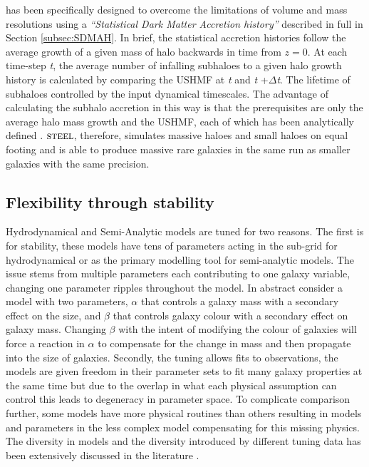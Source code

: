 \steel has been specifically designed to overcome the limitations of volume and mass resolutions using a \textit{``Statistical Dark Matter Accretion history''} described in full in Section \ref{subsec:SDMAH}. In brief, the statistical accretion histories follow the average growth of a given mass of halo backwards in time from $z = 0$. At each time-step \textit{t}, the average number of infalling subhaloes to a given halo growth history is calculated by comparing the USHMF at \textit{t} and \textit{t} +$\Delta$\textit{t}. The lifetime of subhaloes controlled by the input dynamical timescales. The advantage of calculating the subhalo accretion in this way is that the prerequisites are only the average halo mass growth and the USHMF, each of which has been analytically defined \cite{vandenBosch2014ComingWells, Jiang2016StatisticsFunctions}.
$\textsc{steel}$, therefore, simulates massive haloes and small haloes on equal footing and is able to produce massive rare galaxies in the same run as smaller galaxies with the same precision.

\subsection{Flexibility through stability}
Hydrodynamical and Semi-Analytic models are tuned for two reasons. The first is for stability, these models have tens of parameters acting in the sub-grid for hydrodynamical or as the primary modelling tool for semi-analytic models. The issue stems from multiple parameters each contributing to one galaxy variable, changing one parameter ripples throughout the model. In abstract consider a model with two parameters, $\alpha$ that controls a galaxy mass with a secondary effect on the size, and $\beta$ that controls galaxy colour with a secondary effect on galaxy mass. Changing $\beta$ with the intent of modifying the colour of galaxies will force a reaction in $\alpha$ to compensate for the change in mass and then propagate into the size of galaxies. Secondly, the tuning allows fits to observations, the models are given freedom in their parameter sets to fit many galaxy properties at the same time but due to the overlap in what each physical assumption can control this leads to degeneracy in parameter space. To complicate comparison further, some models have more physical routines than others resulting in models and parameters in the less complex model compensating for this missing physics. The diversity in models and the diversity introduced by different tuning data has been extensively discussed in the literature \cite{Knebe2015NIFTyModels,Cui2018TheApplications,Knebe2018CosmicModels}.   

